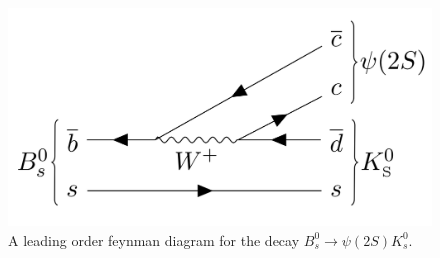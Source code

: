   \begin{figure}[!htb]
    \centering
    \includegraphics[width=12cm]{graphics/image.png}
    \caption{A leading order feynman diagram for the decay $B_s^0 \rightarrow \psi(2S) K_s^0$. \cite{sample}}
    \label{f2}
  \end{figure}
